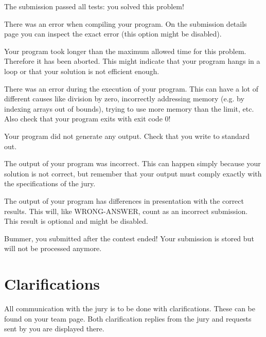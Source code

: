 \begin{description}[\setleftmargin{4.5cm}]
\item[CORRECT]
The submission passed all tests: you solved this problem!

\item[COMPILER-ERROR]
There was an error when compiling your program. On the submission
details page you can inspect the exact error (this option might be
disabled).

\item[TIMELIMIT]
Your program took longer than the maximum allowed time for this
problem. Therefore it has been aborted. This might indicate that your
program hangs in a loop or that your solution is not efficient
enough.

\item[RUN-ERROR]
There was an error during the execution of your program. This can have
a lot of different causes like division by zero, incorrectly
addressing memory (e.g. by indexing arrays out of bounds), trying to
use more memory than the limit, etc. 
Also check that your program exits with exit code 0!

\item[NO-OUTPUT]
Your program did not generate any output. Check that you write to
standard out.

\item[WRONG-ANSWER]
The output of your program was incorrect. This can happen simply
because your solution is not correct, but remember that your output
must comply exactly with the specifications of the jury.

\item[PRESENTATION-ERROR]
The output of your program has differences in presentation with the
correct results. This will, like WRONG-ANSWER, count as an incorrect
submission. This result is optional and might be disabled.

\item[TOO-LATE]
Bummer, you submitted after the contest ended! Your submission is
stored but will not be processed anymore.
\end{description}

\section{Clarifications}

All communication with the jury is to be done with clarifications.
These can be found on your team page. Both clarification replies from
the jury and requests sent by you are displayed there.

